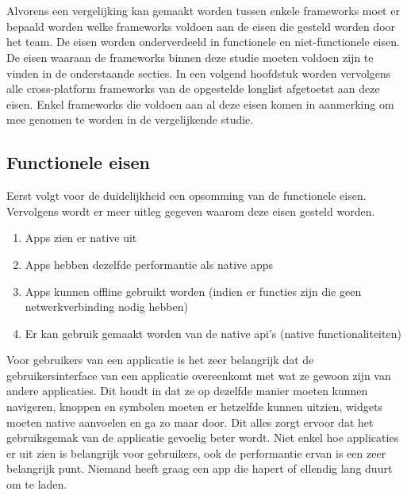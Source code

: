 \chapter{}
\label{ch:eisen-framework}

Alvorens een vergelijking kan gemaakt worden tussen enkele frameworks moet er bepaald worden welke frameworks voldoen aan de eisen die gesteld worden door het team. De eisen worden onderverdeeld in functionele en niet-functionele eisen. De eisen waaraan de frameworks binnen deze studie moeten voldoen zijn te vinden in de onderstaande secties. In een volgend hoofdstuk worden vervolgens alle cross-platform frameworks van de opgestelde longlist afgetoetst aan deze eisen. Enkel frameworks die voldoen aan al deze eisen komen in aanmerking om mee genomen te worden in de vergelijkende studie.

\section{Functionele eisen}
\label{sec:functioneleEisen}

Eerst volgt voor de duidelijkheid een opsomming van de functionele eisen. Vervolgens wordt er meer uitleg gegeven waarom deze eisen gesteld worden.

\begin{enumerate}
    \item Apps zien er native uit
    \item Apps hebben dezelfde performantie als native apps
    \item Apps kunnen offline gebruikt worden (indien er functies zijn die geen netwerkverbinding nodig hebben)
    \item Er kan gebruik gemaakt worden van de native api's (native functionaliteiten)
\end{enumerate}

Voor gebruikers van een applicatie is het zeer belangrijk dat de gebruikersinterface van een applicatie overeenkomt met wat ze gewoon zijn van andere applicaties. Dit houdt in dat ze op dezelfde manier moeten kunnen navigeren, knoppen en symbolen moeten er hetzelfde kunnen uitzien, widgets moeten native aanvoelen en ga zo maar door. Dit alles zorgt ervoor dat het gebruiksgemak van de applicatie gevoelig beter wordt. Niet enkel hoe applicaties er uit zien is belangrijk voor gebruikers, ook de performantie ervan is een zeer belangrijk punt. Niemand heeft graag een app die hapert of ellendig lang duurt om te laden. 

